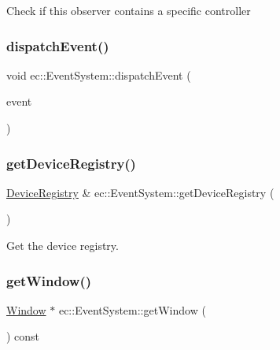 Check if this observer contains a specific controller \mbox{\label{classec_1_1_event_system_a97cde1bf5a2f1f8e5982b4d9e5e62187}} 
\subsubsection{\texorpdfstring{dispatch\+Event()}{dispatchEvent()}}
{\footnotesize\ttfamily void ec\+::\+Event\+System\+::dispatch\+Event (\begin{DoxyParamCaption}\item[{const \mbox{\hyperlink{structec_1_1_input_event}{Input\+Event}} \&}]{event }\end{DoxyParamCaption})}

\mbox{\label{classec_1_1_event_system_a8c84a98e39be4a735dc882e19e4b309a}} 
\subsubsection{\texorpdfstring{get\+Device\+Registry()}{getDeviceRegistry()}}
{\footnotesize\ttfamily \mbox{\hyperlink{classec_1_1_device_registry}{Device\+Registry}} \& ec\+::\+Event\+System\+::get\+Device\+Registry (\begin{DoxyParamCaption}{ }\end{DoxyParamCaption})}

Get the device registry. \mbox{\label{classec_1_1_event_system_a49289b02be391da14f42cef7bbb63fc3}} 
\subsubsection{\texorpdfstring{get\+Window()}{getWindow()}}
{\footnotesize\ttfamily \mbox{\hyperlink{classec_1_1_window}{Window}} $\ast$ ec\+::\+Event\+System\+::get\+Window (\begin{DoxyParamCaption}{ }\end{DoxyParamCaption}) const}

